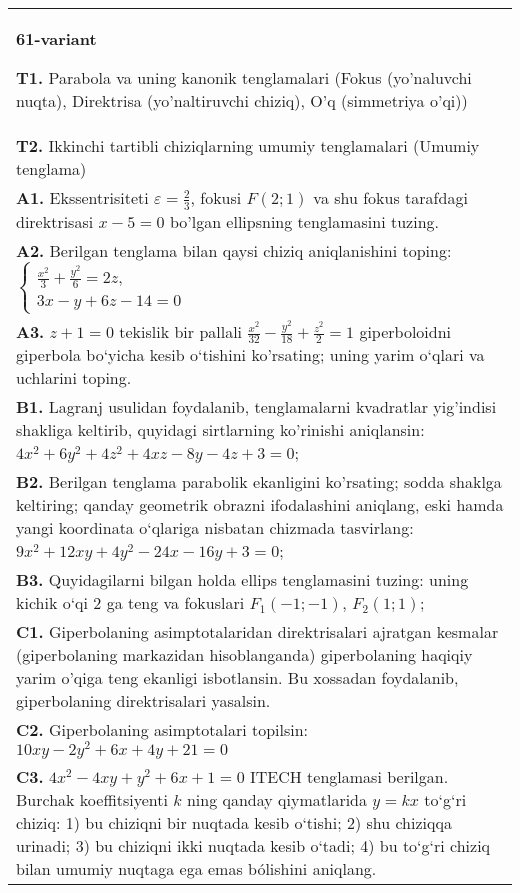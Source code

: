 \documentclass{article}
\begin{document}
\begin{tabular}{m{17cm}}
\textbf{61-variant}
\newline

\textbf{T1.} Parabola va uning kanonik tenglamalari (Fokus (yo’naluvchi nuqta), Direktrisa (yo’naltiruvchi chiziq), O’q (simmetriya o’qi)) \\
\textbf{T2.} Ikkinchi tartibli chiziqlarning umumiy tenglamalari (Umumiy tenglama) \\
\textbf{A1.} Ekssentrisiteti $\varepsilon=\frac{2}{3}$, fokusi $F(2 ; 1)$ va shu fokus tarafdagi direktrisasi $x-5=0$ bo'lgan ellipsning tenglamasini tuzing. \\
\textbf{A2.} Berilgan tenglama bilan qaysi chiziq aniqlanishini toping: $\left\{\begin{array}{l}\frac{x^2}{3}+\frac{y^2}{6}=2 z, \\ 3 x-y+6 z-14=0\end{array}\right.$ \\
\textbf{A3.} $z+1=0$ tekislik bir pallali $\frac{x^2}{32}-\frac{y^2}{18}+\frac{z^2}{2}=1$ giperboloidni giperbola bo‘yicha kesib o‘tishini ko'rsating; uning yarim o‘qlari va uchlarini toping. \\
\textbf{B1.} Lagranj usulidan foydalanib, tenglamalarni kvadratlar yig'indisi shakliga keltirib, quyidagi sirtlarning ko'rinishi aniqlansin: $4 x^2+6 y^2+4 z^2+4 x z-8 y-4 z+3=0$; \\
\textbf{B2.} Berilgan tenglama parabolik ekanligini ko'rsating; sodda shaklga keltiring; qanday geometrik obrazni ifodalashini aniqlang, eski hamda yangi koordinata o‘qlariga nisbatan chizmada tasvirlang: $9 x^2+12 x y+4 y^2-24 x-16 y+3=0$; \\
\textbf{B3.} Quyidagilarni bilgan holda ellips tenglamasini tuzing: uning kichik o‘qi 2 ga teng va fokuslari $F_1 (-1;-1) $, $F_2 (1; 1) $; \\
\textbf{C1.} Giperbolaning asimptotalaridan direktrisalari ajratgan kesmalar (giperbolaning markazidan hisoblanganda) giperbolaning haqiqiy yarim o'qiga teng ekanligi isbotlansin. Bu xossadan foydalanib, giperbolaning direktrisalari yasalsin. \\
\textbf{C2.} Giperbolaning asimptotalari topilsin: $10 x y-2 y^2+6 x+4 y+21=0$ \\
\textbf{C3.} $4 x^2-4 x y+y^2+6 x+1=0$ ITECH tenglamasi berilgan. Burchak koeffitsiyenti $k$ ning qanday qiymatlarida $y=kx$ to‘g‘ri chiziq: 1) bu chiziqni bir nuqtada kesib o‘tishi; 2) shu chiziqqa urinadi; 3) bu chiziqni ikki nuqtada kesib o‘tadi; 4) bu to‘g‘ri chiziq bilan umumiy nuqtaga ega emas bólishini aniqlang. \\

\end{tabular}
\vspace{1cm}
\end{document}
